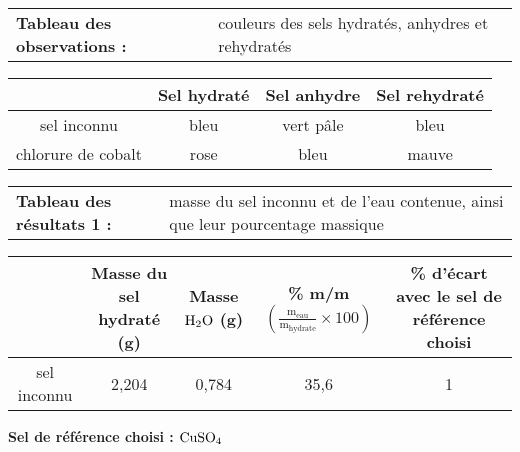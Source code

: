 \documentclass[11pt]{article}
\begin{document}
\noindent\setlength\tabcolsep{0pt}
\begin{center}
\begin{tabularx}{{\textwidth}}{lX}
	  \textbf{Tableau des observations : }
	& couleurs des sels hydratés, anhydres et rehydratés\\
\end{tabularx}
\begin{tabularx}{{\textwidth}}{@{}|c|C|C|C|@{}}
\hline
	& Sel hydraté
	& Sel anhydre
	& Sel rehydraté\\
\hline
	  sel inconnu
	& bleu
	& vert pâle
	& bleu\\
\hline
	  chlorure de cobalt
	& rose
	& bleu
	& mauve\\
\hline
\end{tabularx}
\end{center}
\pagebreak

\noindent\setlength\tabcolsep{0pt}
\begin{center}
\begin{tabularx}{{\textwidth}}{lX}
	  \textbf{Tableau des résultats 1 : }
	& masse du sel inconnu et de l'eau contenue, ainsi que leur pourcentage massique\\
\end{tabularx}
\begin{tabularx}{{\textwidth}}{@{}|C|c|c|c|c|@{}}
\hline
	& \parbox[c]{20mm}{\centering Masse du sel hydraté\\(g)}
	& \parbox[c]{15mm}{\centering Masse $\ce{H2O}$\\(g)}
	& \parbox[c]{28mm}{\centering \% m/m\\$\left (\frac{\mathrm{m_{eau}}}{\mathrm{m_{hydrate}}}\times100\right )$}
	& \parbox[c]{26mm}{\centering \% d'écart avec le sel de référence choisi}\\
\hline
	  sel inconnu
	& 2,204
	& 0,784
	& 35,6 
	& 1\\
\hline
\end{tabularx}
\justifying\textbf{Sel de référence choisi :} $\ce{CuSO4}$
\end{center}
\end{document}
